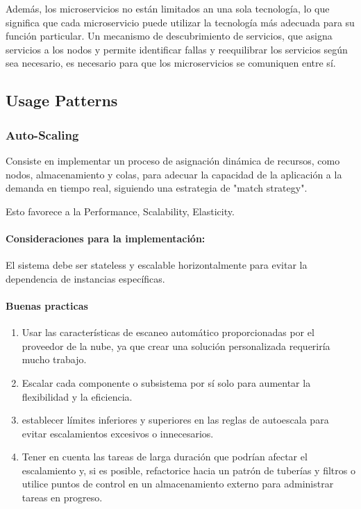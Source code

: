 \documentclass{article}
\begin{document}
		Además, los microservicios no están limitados an una sola tecnología, lo que significa que cada microservicio puede utilizar la tecnología más adecuada para su función particular. Un mecanismo de descubrimiento de servicios, que asigna servicios a los nodos y permite identificar fallas y reequilibrar los servicios según sea necesario, es necesario para que los microservicios se comuniquen entre sí.
		
		\subsection{Usage Patterns}
		\subsubsection{Auto-Scaling}
		Consiste en implementar un proceso de asignación dinámica de recursos, como nodos, almacenamiento y colas, para adecuar la capacidad de la aplicación a la demanda en tiempo real, siguiendo una estrategia de "match strategy".
		
		Esto favorece a la Performance, Scalability, Elasticity.
		
		\paragraph{Consideraciones para la implementación:} 		
		El sistema debe ser stateless y escalable horizontalmente para evitar la dependencia de instancias específicas.
		
		\paragraph{Buenas practicas} 		
			\begin{enumerate}
				\item Usar las características de escaneo automático proporcionadas por el proveedor de la nube, ya que crear una solución personalizada requeriría mucho trabajo. 
				\item Escalar cada componente o subsistema por sí solo para aumentar la flexibilidad y la eficiencia.
				\item establecer límites inferiores y superiores en las reglas de autoescala para evitar escalamientos excesivos o innecesarios.
				\item Tener en cuenta las tareas de larga duración que podrían afectar el escalamiento y, si es posible, refactorice hacia un patrón de tuberías y filtros o utilice puntos de control en un almacenamiento externo para administrar tareas en progreso.
			\end{enumerate}
		
\end{document}
